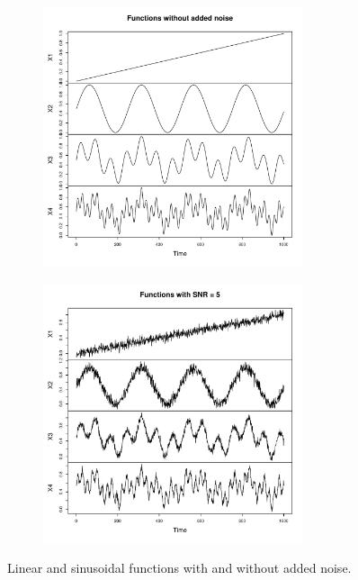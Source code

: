 \begin{figure}[h]
  \begin{subfigure}[b]{0.45\textwidth}
\includegraphics[width = 0.9\linewidth, height = 3in]{./figs/coeff-interp-simple-functions0.pdf}
  \end{subfigure}
  \hfill
  \begin{subfigure}[b]{0.45\textwidth}
  \includegraphics[width = 0.9\linewidth, height = 3in]{./figs/coeff-interp-simple-functions1.pdf}
  \end{subfigure}
  \caption{Linear and sinusoidal functions with and 
  without added noise.}
     \label{fig:simple-functions}
\end{figure}

